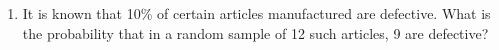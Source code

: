 \begin{enumerate}[label=\thechapter.\arabic*,ref=\thechapter.\theenumi]
\item
It is known that 10\% of certain articles manufactured are defective. What is the probability that in a random sample of 12 such articles, 9 are defective?
\end{enumerate}
